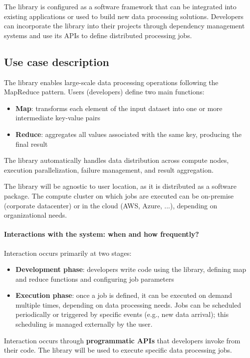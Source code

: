 \documentclass{scrartcl}
\begin{document}
The library is configured as a software framework that can be integrated into existing applications or used to build new data processing solutions. Developers can incorporate the library into their projects through dependency management systems and use its APIs to define distributed processing jobs.

\subsection{Use case description}

The library enables large-scale data processing operations following the MapReduce pattern. Users (developers) define two main functions:
%
\begin{itemize}
    \item \textbf{Map}: transforms each element of the input dataset into one or more intermediate key-value pairs
    \item \textbf{Reduce}: aggregates all values associated with the same key, producing the final result
\end{itemize}
%
The library automatically handles data distribution across compute nodes, execution parallelization, failure management, and result aggregation.

The library will be agnostic to user location, as it is distributed as a software package. The compute cluster on which jobs are executed can be on-premise (corporate datacenter) or in the cloud (AWS, Azure, ...), depending on organizational needs.

\paragraph{Interactions with the system: when and how frequently?}
Interaction occurs primarily at two stages:
%
\begin{itemize}
    \item \textbf{Development phase}: developers write code using the library, defining map and reduce functions and configuring job parameters
    \item \textbf{Execution phase}: once a job is defined, it can be executed on demand multiple times, depending on data processing needs. Jobs can be scheduled periodically or triggered by specific events (e.g., new data arrival); this scheduling is managed externally by the user.
\end{itemize}

Interaction occurs through \textbf{programmatic APIs} that developers invoke from their code. The library will be used to execute specific data processing jobs.
\end{document}
